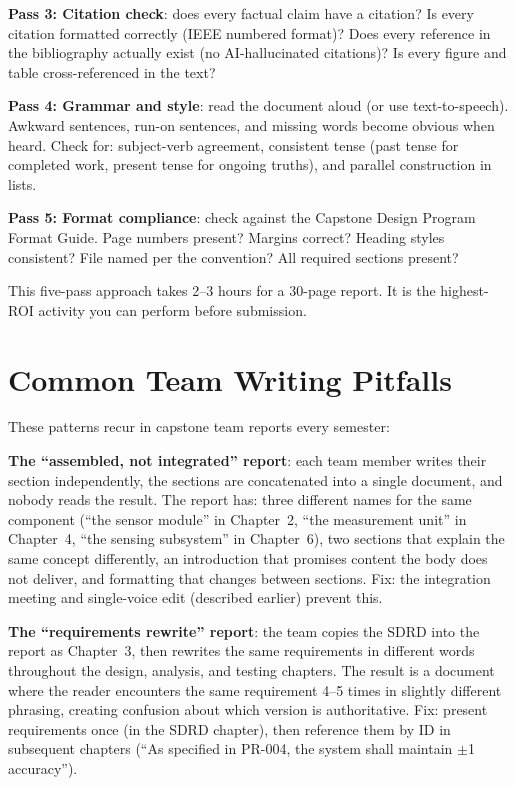 \textbf{Pass 3: Citation check}: does every factual claim have a citation? Is every citation formatted correctly (IEEE numbered format)? Does every reference in the bibliography actually exist (no AI-hallucinated citations)? Is every figure and table cross-referenced in the text?

\textbf{Pass 4: Grammar and style}: read the document aloud (or use text-to-speech). Awkward sentences, run-on sentences, and missing words become obvious when heard. Check for: subject-verb agreement, consistent tense (past tense for completed work, present tense for ongoing truths), and parallel construction in lists.

\textbf{Pass 5: Format compliance}: check against the Capstone Design Program Format Guide. Page numbers present? Margins correct? Heading styles consistent? File named per the convention? All required sections present?

This five-pass approach takes 2--3 hours for a 30-page report. It is the highest-ROI activity you can perform before submission.



\section{Common Team Writing Pitfalls}
These patterns recur in capstone team reports every semester:

\textbf{The ``assembled, not integrated'' report}: each team member writes their section independently, the sections are concatenated into a single document, and nobody reads the result. The report has: three different names for the same component (``the sensor module'' in Chapter~2, ``the measurement unit'' in Chapter~4, ``the sensing subsystem'' in Chapter~6), two sections that explain the same concept differently, an introduction that promises content the body does not deliver, and formatting that changes between sections. Fix: the integration meeting and single-voice edit (described earlier) prevent this.

\textbf{The ``requirements rewrite'' report}: the team copies the SDRD into the report as Chapter~3, then rewrites the same requirements in different words throughout the design, analysis, and testing chapters. The result is a document where the reader encounters the same requirement 4--5 times in slightly different phrasing, creating confusion about which version is authoritative. Fix: present requirements once (in the SDRD chapter), then reference them by ID in subsequent chapters (``As specified in PR-004, the system shall maintain $\pm$1\,\degC{} accuracy'').

